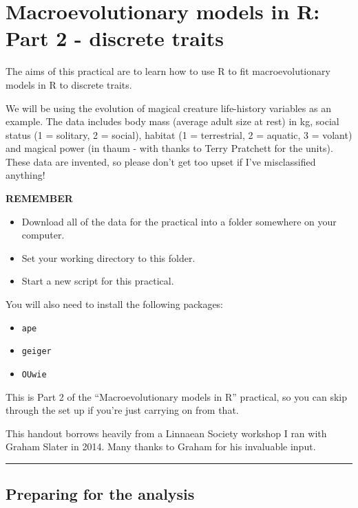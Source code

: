 \documentclass[]{book}
\providecommand{\tightlist}{%
  \setlength{\itemsep}{0pt}\setlength{\parskip}{0pt}}
\begin{document}
\chapter{Macroevolutionary models in R: Part 2 - discrete
traits}\label{macroevolutionary-models-in-r-part-2---discrete-traits}

The aims of this practical are to learn how to use R to fit
macroevolutionary models in R to discrete traits.

We will be using the evolution of magical creature life-history
variables as an example. The data includes body mass (average adult size
at rest) in kg, social status (1 = solitary, 2 = social), habitat (1 =
terrestrial, 2 = aquatic, 3 = volant) and magical power (in thaum - with
thanks to Terry Pratchett for the units). These data are invented, so
please don't get too upset if I've misclassified anything!

\textbf{REMEMBER}

\begin{itemize}
\tightlist
\item
  Download all of the data for the practical into a folder somewhere on
  your computer.
\item
  Set your working directory to this folder.
\item
  Start a new script for this practical.
\end{itemize}

You will also need to install the following packages:

\begin{itemize}
\tightlist
\item
  \texttt{ape}
\item
  \texttt{geiger}
\item
  \texttt{OUwie}
\end{itemize}

This is Part 2 of the ``Macroevolutionary models in R'' practical, so
you can skip through the set up if you're just carrying on from that.

This handout borrows heavily from a Linnaean Society workshop I ran with
Graham Slater in 2014. Many thanks to Graham for his invaluable input.

\begin{center}\rule{0.5\linewidth}{\linethickness}\end{center}

\section{Preparing for the analysis}\label{preparing-for-the-analysis-2}
\end{document}
